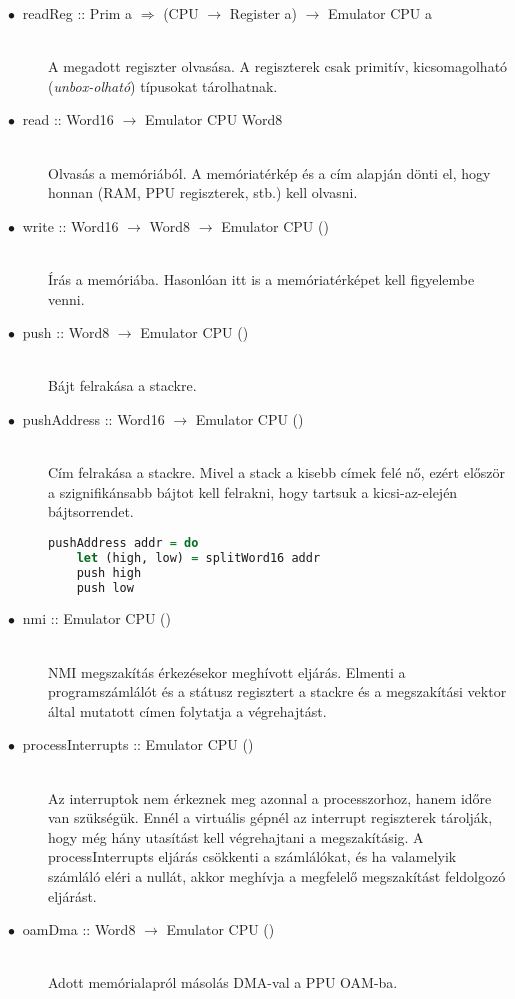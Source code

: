 \begin{description}
	\item[$\bullet\:$ readReg :: Prim a $\Rightarrow$ (CPU $\rightarrow$ Register a) $\rightarrow$ Emulator CPU a] \hfill \\
	A megadott regiszter olvasása. A regiszterek csak primitív, kicsomagolható (\emph{unbox-olható}) típusokat tárolhatnak.
	\item[$\bullet\:$ read :: Word16 $\rightarrow$ Emulator CPU Word8] \hfill \\
	Olvasás a memóriából. A memóriatérkép és a cím alapján dönti el, hogy honnan (RAM, PPU regiszterek, stb.) kell olvasni.
	\item[$\bullet\:$ write :: Word16 $\rightarrow$ Word8 $\rightarrow$ Emulator CPU ()] \hfill \\
	Írás a memóriába. Hasonlóan itt is a memóriatérképet kell figyelembe venni.
	\item[$\bullet\:$ push :: Word8 $\rightarrow$ Emulator CPU ()] \hfill \\
	Bájt felrakása a stackre.
	\item[$\bullet\:$ pushAddress :: Word16 $\rightarrow$ Emulator CPU ()] \hfill \\
	Cím felrakása a stackre. Mivel a stack a kisebb címek felé nő, ezért először a szignifikánsabb bájtot kell felrakni, hogy tartsuk a kicsi-az-elején bájtsorrendet.
\begin{lstlisting}[language=Haskell, basicstyle=\scriptsize]
pushAddress addr = do
	let (high, low) = splitWord16 addr 
	push high
	push low
\end{lstlisting}
	\item[$\bullet\:$ nmi :: Emulator CPU ()] \hfill \\
	NMI megszakítás érkezésekor meghívott eljárás. Elmenti a programszámlálót és a státusz regisztert a stackre és a megszakítási vektor által mutatott címen folytatja a végrehajtást.
	\item[$\bullet\:$ processInterrupts :: Emulator CPU ()] \hfill \\
	Az interruptok nem érkeznek meg azonnal a processzorhoz, hanem időre van szükségük.
	Ennél a virtuális gépnél az interrupt regiszterek tárolják, hogy még hány utasítást kell végrehajtani a megszakításig. A processInterrupts eljárás csökkenti a számlálókat, és ha valamelyik számláló eléri a nullát, akkor meghívja a megfelelő megszakítást feldolgozó eljárást. 
	\item[$\bullet\:$ oamDma :: Word8 $\rightarrow$ Emulator CPU ()] \hfill \\
	Adott memórialapról másolás DMA-val a PPU OAM-ba.
\end{description}

